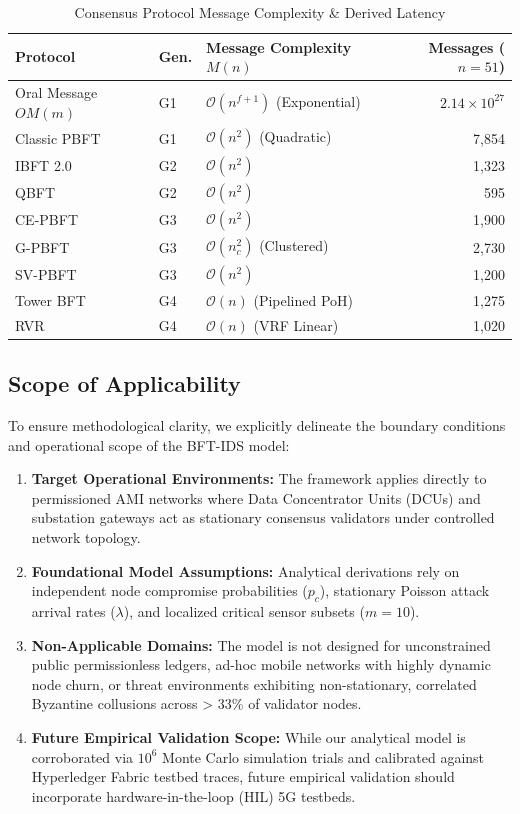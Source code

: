 \documentclass[10pt,twocolumn,journal]{IEEEtran}
\begin{document}
\begin{table}[h]
\caption{Consensus Protocol Message Complexity & Derived Latency}
\label{tab:complexity_analysis}
\centering
\scriptsize
\begin{tabular}{@{}lllr@{}}
\toprule
\textbf{Protocol} & \textbf{Gen.} & \textbf{Message Complexity $M(n)$} & \textbf{Messages ($n=51$)} \\
\midrule
Oral Message $OM(m)$ & G1 & $\mathcal{O}(n^{f+1})$ (Exponential) & $2.14 \times 10^{27}$ \\
Classic PBFT & G1 & $\mathcal{O}(n^2)$ (Quadratic) & 7,854 \\
IBFT 2.0 & G2 & $\mathcal{O}(n^2)$ & 1,323 \\
QBFT & G2 & $\mathcal{O}(n^2)$ & 595 \\
CE-PBFT & G3 & $\mathcal{O}(n^2)$ & 1,900 \\
G-PBFT & G3 & $\mathcal{O}(n_c^2)$ (Clustered) & 2,730 \\
SV-PBFT & G3 & $\mathcal{O}(n^2)$ & 1,200 \\
Tower BFT & G4 & $\mathcal{O}(n)$ (Pipelined PoH) & 1,275 \\
RVR & G4 & $\mathcal{O}(n)$ (VRF Linear) & 1,020 \\
\bottomrule
\end{tabular}
\end{table}

\subsection{Scope of Applicability}
To ensure methodological clarity, we explicitly delineate the boundary conditions and operational scope of the BFT-IDS model:
\begin{enumerate}[leftmargin=*]
    \item \textbf{Target Operational Environments:} The framework applies directly to permissioned AMI networks where Data Concentrator Units (DCUs) and substation gateways act as stationary consensus validators under controlled network topology.
    \item \textbf{Foundational Model Assumptions:} Analytical derivations rely on independent node compromise probabilities ($p_c$), stationary Poisson attack arrival rates ($\lambda$), and localized critical sensor subsets ($m=10$).
    \item \textbf{Non-Applicable Domains:} The model is not designed for unconstrained public permissionless ledgers, ad-hoc mobile networks with highly dynamic node churn, or threat environments exhibiting non-stationary, correlated Byzantine collusions across > 33\% of validator nodes.
    \item \textbf{Future Empirical Validation Scope:} While our analytical model is corroborated via $10^6$ Monte Carlo simulation trials and calibrated against Hyperledger Fabric testbed traces, future empirical validation should incorporate hardware-in-the-loop (HIL) 5G testbeds.
\end{enumerate}
\end{document}
